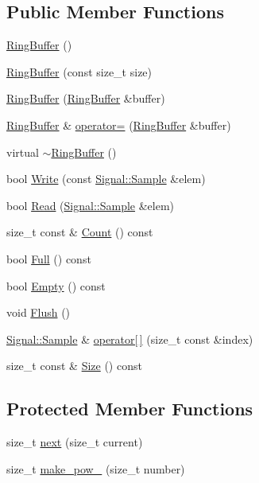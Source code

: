 \subsection*{Public Member Functions}
\begin{DoxyCompactItemize}
\item 
\hyperlink{classSignal_1_1RingBuffer_a66b2a49fc1ea8d4e2d529362452a9e5e}{Ring\+Buffer} ()
\item 
\hyperlink{classSignal_1_1RingBuffer_aab0efff6a85c76ce9063b6a7dcc1fe97}{Ring\+Buffer} (const size\+\_\+t size)
\item 
\hyperlink{classSignal_1_1RingBuffer_a9823e69bede828ca41cdf0b8372224f7}{Ring\+Buffer} (\hyperlink{classSignal_1_1RingBuffer}{Ring\+Buffer} \&buffer)
\item 
\hyperlink{classSignal_1_1RingBuffer}{Ring\+Buffer} \& \hyperlink{classSignal_1_1RingBuffer_a2bc19d3eb407be62e36ac327bffe4b2f}{operator=} (\hyperlink{classSignal_1_1RingBuffer}{Ring\+Buffer} \&buffer)
\item 
virtual \hyperlink{classSignal_1_1RingBuffer_aff2a78175f358585ddf207f470062d3e}{$\sim$\+Ring\+Buffer} ()
\item 
bool \hyperlink{classSignal_1_1RingBuffer_aa291195b777aa50aa7a61ab1f4954bce}{Write} (const \hyperlink{classSignal_1_1Sample}{Signal\+::\+Sample} \&elem)
\item 
bool \hyperlink{classSignal_1_1RingBuffer_a9a5c8429c0e422e3d4763adb78b0a87c}{Read} (\hyperlink{classSignal_1_1Sample}{Signal\+::\+Sample} \&elem)
\item 
size\+\_\+t const \& \hyperlink{classSignal_1_1RingBuffer_acf6e81f09bb9f10a79ced6da84e78e20}{Count} () const 
\item 
bool \hyperlink{classSignal_1_1RingBuffer_ac8124016cfc0c833a3565c87d5f6f1e5}{Full} () const 
\item 
bool \hyperlink{classSignal_1_1RingBuffer_a73416d725604567d4b496f9821bc0c04}{Empty} () const 
\item 
void \hyperlink{classSignal_1_1RingBuffer_aa9d2938e5c11c5d3c058db9b7e310406}{Flush} ()
\item 
\hyperlink{classSignal_1_1Sample}{Signal\+::\+Sample} \& \hyperlink{classSignal_1_1Buffer_a0b4ced776c42720b214f6054fa21547a}{operator\mbox{[}$\,$\mbox{]}} (size\+\_\+t const \&index)
\item 
size\+\_\+t const \& \hyperlink{classSignal_1_1Buffer_ad0350078d641ed5cb15a9401d9d20ffe}{Size} () const 
\end{DoxyCompactItemize}
\subsection*{Protected Member Functions}
\begin{DoxyCompactItemize}
\item 
size\+\_\+t \hyperlink{classSignal_1_1RingBuffer_a14a5990d51a45d131ee8aebd90bb87b9}{next} (size\+\_\+t current)
\item 
size\+\_\+t \hyperlink{classSignal_1_1RingBuffer_ae81c9b6959e18edabd54a073b936db0c}{make\+\_\+pow\+\_} (size\+\_\+t number)
\end{DoxyCompactItemize}
